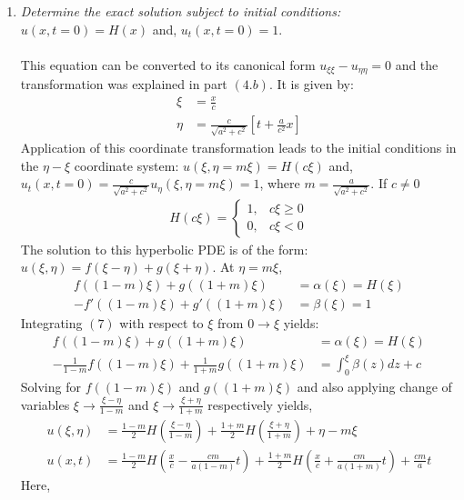 \documentclass[11pt]{article}
\begin{document}
\begin{enumerate}
\begin{enumerate}[label = (\alph*)]
\item{\color{blue}\textit{Determine the exact solution subject to initial conditions:}} $u(x,t=0) = H(x)$ and, $u_t(x,t=0) = 1$. \\ \\
This equation can be converted to its canonical form $u_{\xi\xi} - u_{\eta\eta} = 0$ and the transformation was explained in part $(4.b)$.  It is given by:
\begin{align*}
\xi & = \frac{x}{c} \\ 
\eta & = \frac{c}{\sqrt{a^2 + c^2}}\left[t + \frac{a}{c^2} x\right]
\end{align*}
Application of this coordinate transformation leads to the initial conditions in the $\eta-\xi$ coordinate system: $u(\xi, \eta = m\xi) = H(c\xi)$ and, $u_t(x,t = 0) = \frac{c}{\sqrt{a^2+c^2}}u_\eta(\xi, \eta = m\xi) = 1$, where $m = \frac{a}{\sqrt{a^2 + c^2}}$. If $c \neq 0$
\begin{align*}
H(c\xi) = 
\begin{cases}
1, & c\xi \geq 0 \\
0, & c\xi < 0
\end{cases}
\end{align*}
The solution to this hyperbolic PDE is of the form: $u(\xi,\eta) = f(\xi-\eta) + g(\xi + \eta)$. At $\eta = m\xi$,
\begin{align}
f((1-m)\xi) + g((1+m)\xi) & = \alpha(\xi) = H(\xi) \\
-f'((1-m)\xi) + g'((1+m)\xi) & = \beta(\xi) = 1 
\end{align}
Integrating $(7)$ with respect to $\xi$ from $0 \rightarrow \xi$ yields:
\begin{align}
f((1-m)\xi) + g((1+m)\xi) & = \alpha(\xi) = H(\xi) \\
-\frac{1}{1-m}f((1-m)\xi) + \frac{1}{1+m}g((1+m)\xi) & = \int_0^\xi \beta(z) dz + c  
\end{align}
Solving for $f((1-m)\xi)$ and $g((1+m)\xi)$ and also applying change of variables $\xi \rightarrow \frac{\xi-\eta}{1-m}$  and $\xi \rightarrow \frac{\xi+\eta}{1+m}$ respectively yields, 
\begin{align*}
u(\xi,\eta) & = \frac{1-m}{2}H\left(\frac{\xi - \eta}{1-m}\right) + \frac{1+m}{2}H\left(\frac{\xi+\eta}{1+m}\right) + \eta - m\xi \\
u(x,t) & = \frac{1-m}{2} H\left(\frac{x}{c} - \frac{cm}{a(1-m)}t\right) + \frac{1+m}{2}H\left(\frac{x}{c} + \frac{cm}{a(1+m)}t\right) + \frac{cm}{a} t
\end{align*}
Here,
\begin{align*}

\end{align*}
\end{enumerate}
\end{enumerate}
\end{document}
